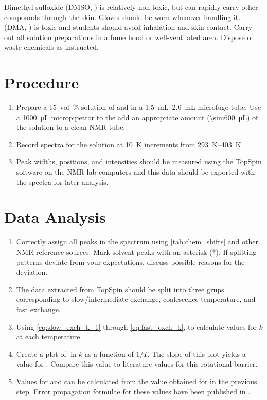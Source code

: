 \documentclass[nobib,nofonts,nols,nohyper]{tufte-handout}
\begin{document}
Dimethyl sulfoxide (DMSO, ) is relatively non-toxic, but can rapidly carry other compounds through the skin. 
Gloves should be worn whenever handling it. 
 (DMA, ) is toxic and students should avoid inhalation and skin contact. 
Carry out all solution preparations in a fume hood or well-ventilated area. 
Dispose of waste chemicals as instructed. 


\section{Procedure} %
\label{sec:procedure}

\begin{enumerate}
	\item Prepare a \qty{15}{vol\percent} solution of  and  in  a \qtyrange{1.5}{2.0}{\mL} microfuge tube. 
	Use a \qty{1000}{\uL} micropipettor to the add an appropriate amount (\qty{\sim600}{\uL}) of the solution to a clean NMR tube. 
	\item Record \NMR* spectra for the solution at \qty{10}{\kelvin} increments from \qtyrange{293}{403}{\kelvin}. 
	\item Peak widths, positions, and intensities should be measured using the TopSpin software on the NMR lab computers and this data should be exported with the spectra for later analysis. 
\end{enumerate}


\section{Data Analysis} %
\label{sec:data_analysis}

\begin{enumerate}
	\item Correctly assign all peaks in the spectrum using \cref{tab:chem_shifts} and other NMR reference sources.\autocite{davis1965advanced,pople1959nmr,silverstein2005spec,burdett1964a,rogers1956a}
	Mark solvent peaks with an asterisk (*). If splitting patterns deviate from your expectations, discuss possible reasons for the deviation. 
	\item The data extracted from TopSpin should be split into three grups corresponding to slow/intermediate exchange, coalescence temperature, and fast exchange. 
	\item Using \cref{eq:slow_exch_k_1} through \cref{eq:fast_exch_k}, to calculate values for \( k \) at each temperature. 
	\item Create a plot of \( \ln{k} \)  as a function of \( 1/T \). 
  The slope of this plot yields a value for . 
  Compare this value to literature values for this rotational barrier. 
	\item Values for  and  can be calculated from the value obtained for  in the previous step. 
  Error propagation formulae for these values have been published in \textcite{morse94nmr}.
\end{enumerate}
\end{document}
